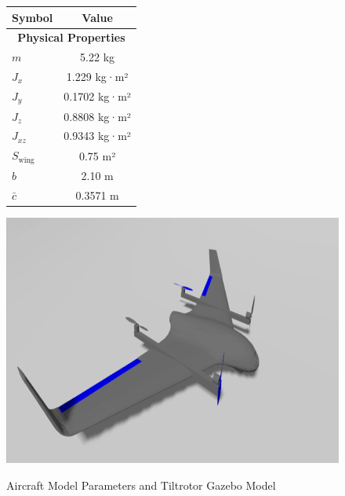 \documentclass[journal,article,submit,pdftex,moreauthors]{Definitions/mdpi}
\begin{document}

\begin{figure}[H]
    \centering
    \begin{minipage}{0.45\linewidth}
        \centering
        \begin{tabular}{|l|c|}
            \hline
            \textbf{Symbol} & \textbf{Value} \\ \hline
            \multicolumn{2}{|c|}{\textbf{Physical Properties}} \\ \hline
            \( m \) & 5.22 kg \\ \hline
            \( J_x \) & 1.229 kg·m² \\ \hline
            \( J_y \) & 0.1702 kg·m² \\ \hline
            \( J_z \) & 0.8808 kg·m² \\ \hline
            \( J_{xz} \) & 0.9343 kg·m² \\ \hline
            \( S_{\text{wing}} \) & 0.75 m² \\ \hline
            \( b \) & 2.10 m \\ \hline
            \( \bar{c} \) & 0.3571 m \\ \hline
        \end{tabular}
        \vspace{0.5em} %
        \label{tab:aircraft_model_parameters}
    \end{minipage}
    \hfill %
    \begin{minipage}{0.45\linewidth}
        \centering
        \includegraphics[width=\linewidth]{tiltrotor_gazebo.png}
        \label{fig:tiltrotor_gazebo}
    \end{minipage}
    \caption{Aircraft Model Parameters and Tiltrotor Gazebo Model}
    \label{fig:aircraft_model_parameters_and_gazebo}
\end{figure}
\end{document}
